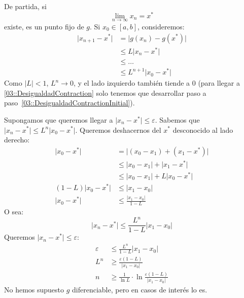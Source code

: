   De partida,
  si
  \begin{equation*}
    \lim_{n\rightarrow \infty} x_n
      = x^*
  \end{equation*}
  existe,
  es un punto fijo de \(g\).
  Si \(x_0 \in [a, b]\),
  consideremos:
  \begin{align}
    \lvert x_{n+1} - x^* \rvert
      &= \lvert g(x_n) - g(x^*) \rvert \\
      &\le L \lvert x_n - x^* \rvert
           \label{03::DesigualdadContractionInitial} \\
      &\le \ldots \\
      &\le L^{n+1} \lvert x_0 - x^* \rvert
           \label{03::DesigualdadContraction}
  \end{align}
  Como \(\lvert L \rvert < 1\),
  \(L^n \to 0\),
  y el lado izquierdo también tiende a \num{0}
  (para llegar a \eqref{03::DesigualdadContraction}
   solo tenemos que desarrollar
   paso a paso~\eqref{03::DesigualdadContractionInitial}).

  Supongamos que queremos llegar a \(\lvert x_n-x^* \rvert\le \varepsilon\).
  Sabemos que \(\lvert x_n - x^* \rvert \le L^{n} \lvert x_0 - x^* \rvert\).
  Queremos deshacernos del \(x^*\) desconocido al lado derecho:
  \begin{align*}
    \lvert x_0 - x^* \rvert
      &=   \lvert (x_0-x_1) + (x_1-x^*) \rvert \\
      &\le \lvert x_0 - x_1 \rvert + \lvert x_1 - x^* \rvert \\
      &\le \lvert x_0 - x_1 \rvert +L \lvert x_0 - x^* \rvert \\
    (1 - L) \lvert x_0 - x^* \rvert
      &\le \lvert x_1 - x_0 \rvert \\
    \lvert x_0 - x^* \rvert
      &\le \frac{\lvert x_1-x_0 \rvert}{1 - L}
  \end{align*}
  O sea:
  \begin{equation}
    \lvert x_n - x^* \rvert
      \le \frac{L^n}{1 - L} \lvert x_1 - x_0 \rvert
  \end{equation}
  Queremos \(\lvert x_n - x^* \rvert \le \varepsilon\):
  \begin{align*}
    \varepsilon
      &\le \frac{L^n}{1 - L} \lvert x_1 - x_0 \rvert \\
    L^n
      &\ge \frac{\varepsilon(1 - L)}{\lvert x_1 - x_0 \rvert} \\
    n
      &\ge \frac{1}{\ln L}
              \cdot \ln \frac{\varepsilon(1 - L)}{\lvert x_1 - x_0 \rvert}
  \end{align*}
  No hemos supuesto \(g\) diferenciable,
  pero en casos de interés lo es.

